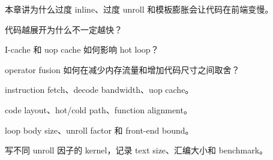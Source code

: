 {本章讲为什么过度 inline、过度 unroll 和模板膨胀会让代码在前端变慢。}
{\item 代码越展开为什么不一定越快？
\item I-cache 和 uop cache 如何影响 hot loop？
\item operator fusion 如何在减少内存流量和增加代码尺寸之间取舍？}
{\item instruction fetch、decode bandwidth、uop cache。
\item code layout、hot/cold path、function alignment。
\item loop body size、unroll factor 和 front-end bound。}
{写不同 unroll 因子的 kernel，记录 text size、汇编大小和 benchmark。}
